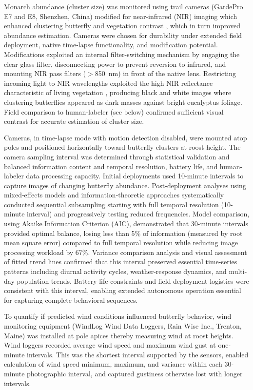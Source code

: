 \documentclass[insects,article,submit,pdftex,moreauthors]{Definitions/mdpi}
\begin{document}
Monarch abundance (cluster size) was monitored using trail cameras (GardePro E7 and E8, Shenzhen, China) modified for near-infrared (NIR) imaging which enhanced clustering butterfly and vegetation contrast \cite{hristovEstimatingOverwinteringMonarch2019}, which in turn improved abundance estimation. Cameras were chosen for durability under extended field deployment, native time-lapse functionality, and modification potential. Modifications exploited an internal filter-switching mechanism by engaging the clear glass filter, disconnecting power to prevent reversion to infrared, and mounting NIR pass filters ($>$850~nm) in front of the native lens. Restricting incoming light to NIR wavelengths exploited the high NIR reflectance characteristic of living vegetation \cite{gatesSpectralPropertiesPlants1965,thajAnalysisOpticalProperties2025}, producing black and white images where clustering butterflies appeared as dark masses against bright eucalyptus foliage. Field comparison to human-labeler (see below) confirmed sufficient visual contrast for accurate estimation of cluster size.

Cameras, in time-lapse mode with motion detection disabled, were mounted atop poles and positioned horizontally toward butterfly clusters at roost height. The camera sampling interval was determined through statistical validation and balanced information content and temporal resolution, battery life, and human-labeler data processing capacity. Initial deployments used 10-minute intervals to capture images of changing butterfly abundance. Post-deployment analyses using mixed-effects models and information-theoretic approaches systematically conducted sequential subsampling starting with full temporal resolution (10-minute interval) and progressively testing reduced frequencies. Model comparison, using Akaike Information Criterion (AIC), demonstrated that 30-minute intervals provided optimal balance, losing less than 5\% of information (measured by root mean square error) compared to full temporal resolution while reducing image processing workload by 67\%. Variance comparison analysis and visual assessment of fitted trend lines confirmed that this interval preserved essential time-series patterns including diurnal activity cycles, weather-response dynamics, and multi-day population trends. Battery life constraints and field deployment logistics were consistent with this interval, enabling extended autonomous operation essential for capturing complete behavioral sequences.

To quantify if predicted wind conditions influenced butterfly behavior, wind monitoring equipment (WindLog Wind Data Loggers, Rain Wise Inc., Trenton, Maine) was installed at pole apices thereby measuring wind at roost heights. Wind loggers recorded average wind speed and maximum wind gust at one-minute intervals. This was the shortest interval supported by the sensors, enabled calculation of wind speed minimum, maximum, and variance within each 30-minute photographic interval, and captured gustiness otherwise lost with longer intervals.
\end{document}
